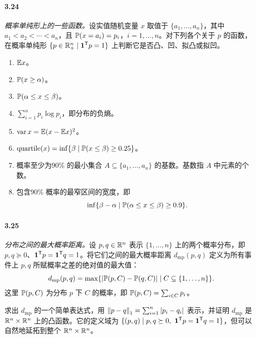 \paragraph{3.24}\textit{概率单纯形上的一些函数。}设实值随机变量 $x$ 取值于 $\{a_1,\ldots,a_n\}$，其中 $a_1<a_2<\cdots<a_n$，且 $\mathbb P(x=a_i)=p_i$，$i=1,\ldots,n$。对下列各个关于 $p$ 的函数，在概率单纯形 $\{p\in\mathbb R_+^n\mid\mathbf 1^\mathsf T p=1\}$ 上判断它是否凸、凹、拟凸或拟凹。
\begin{enumerate}[label=(\alph*)]
\item $\mathbb E x$。
\item $\mathbb P(x\geq\alpha)$。
\item $\mathbb P(\alpha\leq x\leq\beta)$。
\item $\sum_{i=1}^n p_i\log p_i$，即分布的负熵。
\item $\operatorname{var}x=\mathbb E(x-\mathbb E x)^2$。
\item $\operatorname{quartile}(x)=\inf\{\beta\mid\mathbb P(x\leq\beta)\geq0.25\}$。
\item 概率至少为90\% 的最小集合 $A\subseteq\{a_1,\ldots,a_n\}$ 的基数。基数指 $A$ 中元素的个数。
\item 包含90\% 概率的最窄区间的宽度，即
\[\inf\{\beta-\alpha\mid\mathbb P(\alpha\leq x\leq\beta)\geq0.9\}.\]
\end{enumerate}
\paragraph{3.25}\textit{分布之间的最大概率距离。}设 $p,q\in\mathbb R^n$ 表示 $\{1,\ldots,n\}$ 上的两个概率分布，即 $p,q\succeq0$、$\mathbf 1^\mathsf T p=\mathbf 1^\mathsf T q=1$。将它们之间的最大概率距离 $d_{\mathrm{mp}}(p,q)$ 定义为所有事件上 $p,q$ 所赋概率之差的绝对值的最大值：
\[d_{\mathrm{mp}}(p,q)=\max\{|\mathbb P(p,C)-\mathbb P(q,C)|\mid C\subseteq\{1,\ldots,n\}\}.\]
这里 $\mathbb P(p,C)$ 为分布 $p$ 下 $C$ 的概率，即 $\mathbb P(p,C)=\sum_{i\in C}p_i$。

求出 $d_{\mathrm{mp}}$ 的一个简单表达式，用 $\left\lVert p-q\right\rVert_1=\sum_{i=1}^n|p_i-q_i|$ 表示，并证明 $d_{\mathrm{mp}}$ 是 $\mathbb R^n\times\mathbb R^n$ 上的凸函数。它的定义域为 $\{(p,q)\mid p,q\succeq0,\ \mathbf 1^\mathsf T p=\mathbf 1^\mathsf T q=1\}$，但可以自然地延拓到整个 $\mathbb R^n\times\mathbb R^n$。
